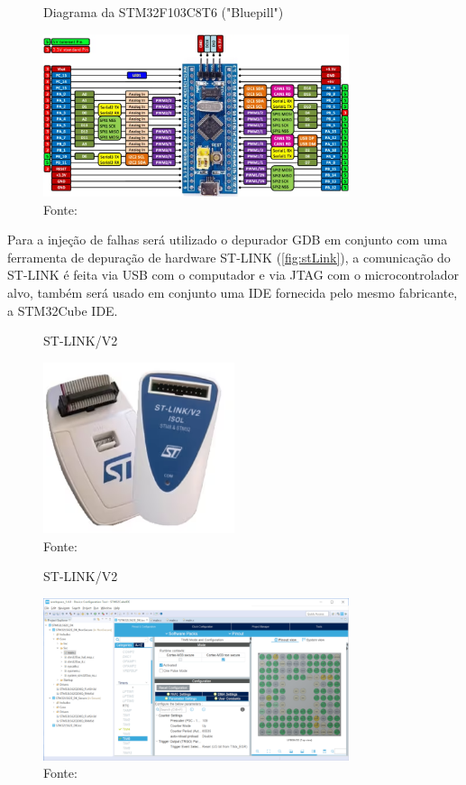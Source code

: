 \begin{figure}[H]
    \centering
    \caption{Diagrama da STM32F103C8T6 ("Bluepill")}
    \includegraphics[width=0.80\textwidth]{assets/stm32_bluepill.png}
    \caption*{Fonte: \cite{STMBoardProductPage}}
    \label{fig:stm32Bluepill}
\end{figure}

Para a injeção de falhas será utilizado o depurador GDB em conjunto com uma ferramenta de depuração de hardware ST-LINK (\autoref{fig:stLink}), a comunicação do ST-LINK é feita via USB com o computador e via JTAG com o microcontrolador alvo, também será usado em conjunto uma IDE fornecida pelo mesmo fabricante, a STM32Cube IDE.

\begin{figure}[H]
    \centering
    \caption{ST-LINK/V2}
    \includegraphics[width=0.50\textwidth]{assets/st_link.png}
    \caption*{Fonte: \cite{STLinkProductPage}}
    \label{fig:stLink}
\end{figure}

\begin{figure}[H]
    \centering
    \caption{ST-LINK/V2}
    \includegraphics[width=0.80\textwidth]{assets/stmcube_ide.png}
    \caption*{Fonte: \cite{STMCubeProductPage}}
    \label{fig:stLink}
\end{figure}

